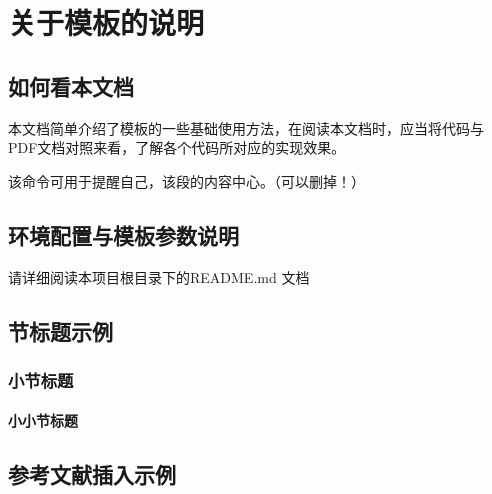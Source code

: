     
\chapter{关于模板的说明}\label{ch:1}


\section{如何看本文档}
本文档简单介绍了模板的一些基础使用方法，在阅读本文档时，应当将代码与PDF文档对照来看，了解各个代码所对应的实现效果。

\begin{shaded}
    该命令可用于提醒自己，该段的内容中心。（可以删掉！）
\end{shaded}

\section{环境配置与模板参数说明}
请详细阅读本项目根目录下的README.md 文档

\section{节标题示例}

\subsection{小节标题}

\subsubsection{小小节标题}

\section{参考文献插入示例}

